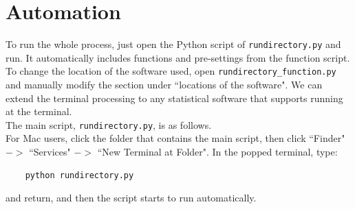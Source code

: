 \documentclass[12pt, a4paper]{article}
\begin{document}
\section{Automation}

To run the whole process, just open the Python script of \texttt{rundirectory.py} and run. It automatically includes functions and pre-settings from the function script.\\

To change the location of the software used, open \texttt{rundirectory\_function.py} and manually modify the section under ``locations of the software". We can extend the terminal processing to any statistical software that supports running at the terminal.\\

The main script, \texttt{rundirectory.py}, is as follows.\\



For Mac users, click the folder that contains the main script, then click ``Finder" $->$ ``Services" $->$ ``New Terminal at Folder". In the popped terminal, type:
\begin{verbatim}
	python rundirectory.py
\end{verbatim}
and return, and then the script starts to run automatically.\\

\nocite{*}
\printbibliography
\end{document}
